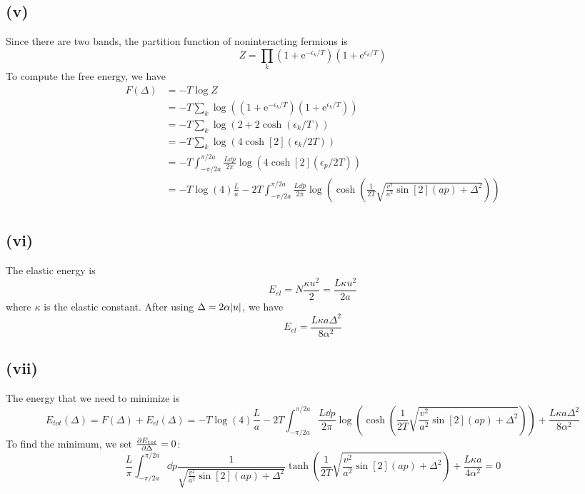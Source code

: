 \documentclass{article}
\newcommand{\me}{\mathrm{e}}
\begin{document}
\subsection*{(v)}
Since there are two bands, the partition function of noninteracting fermions is
\begin{equation}
    Z=\prod_k(1+\me^{-\epsilon_k/T})(1+\me^{\epsilon_k/T})
\end{equation}
To compute the free energy, we have 
\begin{equation}
    \begin{split}
        F(\Delta)&=-T\log Z\\
                 &=-T\sum_k\log((1+\me^{-\epsilon_k/T})(1+\me^{\epsilon_k/T}))\\
                 &=-T\sum_k\log(2+2\cosh(\epsilon_k/T))\\
                 &=-T\sum_k\log(4\cosh[2](\epsilon_k/2T))\\
                 &=-T\int_{-\pi/2a}^{\pi/2a}\frac{L\dd{p}}{2\pi}\log(4\cosh[2](\epsilon_p/2T))\\
                 &=-T\log(4)\frac{L}{a}-2T\int_{-\pi/2a}^{\pi/2a}\frac{L\dd{p}}{2\pi}\log(\cosh(\frac{1}{2T}\sqrt{\frac{v^2}{a^2}\sin[2](ap)+\Delta^2}))\\
    \end{split}
\end{equation}


\subsection*{(vi)}
The elastic energy is 
\begin{equation}
    E_{el}=N\frac{\kappa u^2}{2}=\frac{L\kappa u^2}{2a}
\end{equation}
where $\kappa$ is the elastic constant.
After using $\Delta=2\alpha\abs{u}$, we have 
\begin{equation}
    E_{el}=\frac{L\kappa a\Delta^2}{8\alpha^2}
\end{equation}

\subsection*{(vii)}
The energy that we need to minimize is
\begin{equation}
    E_{tot}(\Delta)=F(\Delta)+E_{el}(\Delta)= -T\log(4)\frac{L}{a}-2T\int_{-\pi/2a}^{\pi/2a}\frac{L\dd{p}}{2\pi}\log(\cosh(\frac{1}{2T}\sqrt{\frac{v^2}{a^2}\sin[2](ap)+\Delta^2}))+\frac{L\kappa a\Delta^2}{8\alpha^2}
\end{equation}
To find the minimum, we set $\pdv{E_{tot}}{\Delta}=0$:
\begin{equation}\label{eq:gap-eq}
    \frac{L}{\pi}\int_{-\pi/2a}^{\pi/2a}\dd{p}\frac{1}{\sqrt{\frac{v^2}{a^2}\sin[2](ap)+\Delta^2}}\tanh(\frac{1}{2T}\sqrt{\frac{v^2}{a^2}\sin[2](ap)+\Delta^2})+\frac{L\kappa a}{4\alpha^2}=0
\end{equation}
\end{document}
